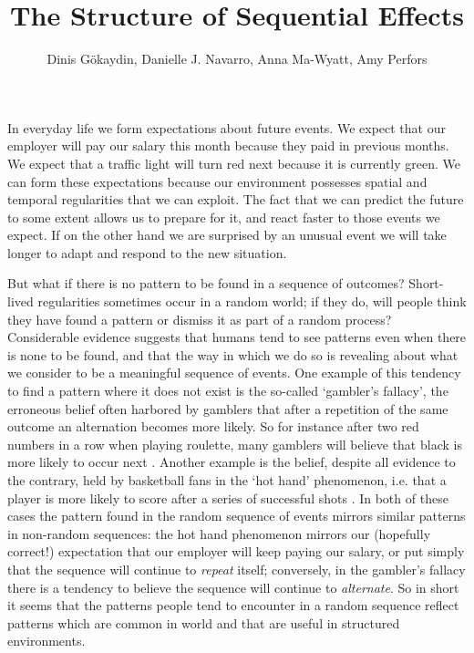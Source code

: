\documentclass{apa}[12pt]
\title{The Structure of Sequential Effects}
\author{\normalsize Dinis G\"okaydin, Danielle J. Navarro, Anna Ma-Wyatt, Amy Perfors}
\affiliation{School of Psychology\\University of Adelaide}
\begin{document}
\maketitle
\newpage

In everyday life we form expectations about future events. We expect that our employer will pay our salary this month because they paid in previous months. We expect that a traffic light will turn red next because it is currently green. We can form these expectations because our environment possesses spatial and temporal regularities that we can exploit. The fact that we can predict the future to some extent allows us to prepare for it, and react faster to those events we expect. If on the other hand we are surprised by an unusual event we will take longer to adapt and respond to the new situation.

But what if there is no pattern to be found in a sequence of outcomes? Short-lived regularities sometimes occur in a random world; if they do, will people think they have found a pattern or dismiss it as part of a random process? Considerable evidence suggests that humans tend to see patterns even when there is none to be found, and that the way in which we do so is revealing about what we consider to be a meaningful sequence of events. One example of this tendency to find a pattern where it does not exist is the so-called `gambler's fallacy', the erroneous belief often harbored by gamblers that after a repetition of the same outcome an alternation becomes more likely. So for instance after two red numbers in a row when playing roulette, many gamblers will believe that black is more likely to occur next \cite{Nickerson02}. Another example is the belief, despite all evidence to the contrary, held by basketball fans in the `hot hand' phenomenon, i.e. that a player is more likely to score after a series of successful shots \cite{Gilovich85}. In both of these cases the pattern found in the random sequence of events mirrors similar patterns in non-random sequences: the hot hand phenomenon mirrors our (hopefully correct!) expectation that our employer will keep paying our salary, or put simply that the sequence will continue to \textit{repeat} itself; conversely, in the gambler's fallacy there is a tendency to believe the sequence will continue to \textit{alternate}. So in short it seems that the patterns people tend to encounter in a random sequence reflect patterns which are common in world and that are useful in structured environments.
\end{document}
